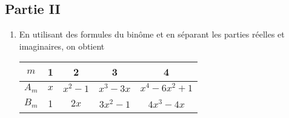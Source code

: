\subsection*{Partie II}
\begin{enumerate}
\item En utilisant des formules du binôme et en séparant les parties réelles et imaginaires, on obtient

\begin{center}
\renewcommand{\arraystretch}{1.5}
\begin{tabular}{c|c|c|c|c}
 $m$ & 1 & 2 & 3 & 4\\ \hline
 $A_m$ & $x$ & $x^2-1$ & $x^3-3x$ & $x^4-6x^2+1$\\\hline
 $B_m$ & 1 & $2x$ & $3x^2-1$ & $4x^3-4x$
\end{tabular}  
\end{center}


\end{enumerate}
